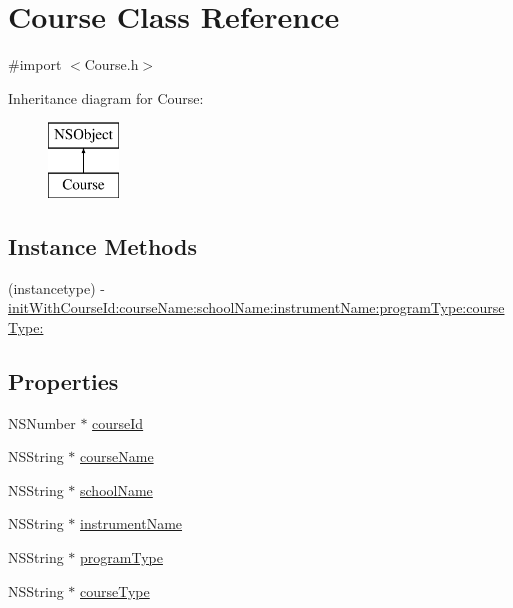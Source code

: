 \hypertarget{interface_course}{\section{Course Class Reference}
\label{interface_course}
}


{\ttfamily \#import $<$Course.\+h$>$}

Inheritance diagram for Course\+:\begin{figure}[H]
\begin{center}
\leavevmode
\includegraphics[height=2.000000cm]{interface_course}
\end{center}
\end{figure}
\subsection*{Instance Methods}
\begin{DoxyCompactItemize}
\item 
(instancetype) -\/ \hyperlink{interface_course_a1047820e29b5f4aae53c3a161824823d}{init\+With\+Course\+Id\+:course\+Name\+:school\+Name\+:instrument\+Name\+:program\+Type\+:course\+Type\+:}
\end{DoxyCompactItemize}
\subsection*{Properties}
\begin{DoxyCompactItemize}
\item 
N\+S\+Number $\ast$ \hyperlink{interface_course_ad03513473cc83651e36749f9e5c5be69}{course\+Id}
\item 
N\+S\+String $\ast$ \hyperlink{interface_course_ace0d7cddc92e6c0d10b1cac95302e1de}{course\+Name}
\item 
N\+S\+String $\ast$ \hyperlink{interface_course_abb8051bfc97aff735cbb00e75f2fef65}{school\+Name}
\item 
N\+S\+String $\ast$ \hyperlink{interface_course_a907b62f431b16309eb1dddb6786f2456}{instrument\+Name}
\item 
N\+S\+String $\ast$ \hyperlink{interface_course_a75b262e8885356165a97a15b69bf1ff1}{program\+Type}
\item 
N\+S\+String $\ast$ \hyperlink{interface_course_a16df4d28af9a7f6e91a5aa4ce583453d}{course\+Type}
\end{DoxyCompactItemize}


